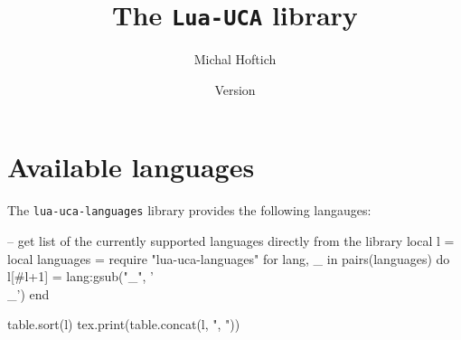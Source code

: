 \documentclass{ltxdoc}
\title{The \texttt{Lua-UCA} library}
\author{Michal Hoftich\authormail{michal.h21@gmail.com}}
\date{Version \version\\\gitdate}
\begin{document}
\maketitle
\tableofcontents
{}

\section{Available languages}

The \texttt{lua-uca-languages} library provides the following langauges:
\bgroup\ttfamily
\begin{luacode*}
-- get list of the currently supported languages directly from the library
local l = {}
local languages = require "lua-uca-languages"
for lang, _ in pairs(languages) do
l[#l+1] = lang:gsub("_", '\\_')
end

table.sort(l)
tex.print(table.concat(l, ", "))
\end{luacode*}
\egroup

\end{document}
